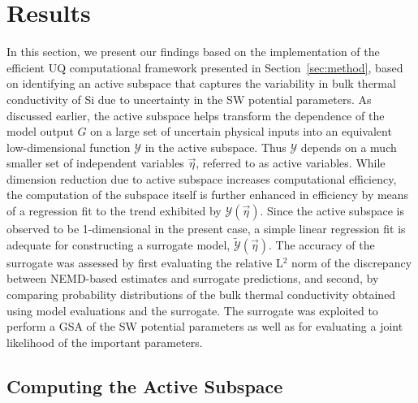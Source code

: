 \section{Results}
\label{sec:results}

In this section, we present our findings based on the implementation of the efficient UQ computational framework 
presented in Section~\ref{sec:method}, based on identifying an active subspace that captures the variability
in bulk thermal conductivity of Si due to uncertainty in the SW potential parameters. As discussed earlier, the
active subspace helps transform the dependence of the model output $G$ on a large set of uncertain physical
inputs into an equivalent low-dimensional function $\mathcal{Y}$ in the active subspace. 
Thus $\mathcal{Y}$ depends on a much smaller set of independent variables $\vec\eta$,
referred to as active variables. While dimension reduction due to active subspace
 increases computational efficiency, the computation of the subspace itself is further enhanced in efficiency
by means of a regression fit to the trend exhibited by $\mathcal{Y}(\vec{\eta})$. Since the active subspace is
observed to be 1-dimensional in the present case, a simple linear regression fit is adequate for constructing
a surrogate model, $\tilde{\mathcal{Y}}(\vec{\eta})$.
The accuracy of the surrogate was assessed by first evaluating the 
relative L$^2$ norm of the discrepancy between NEMD-based estimates and surrogate predictions,
and second, by comparing probability distributions of the bulk thermal conductivity obtained using
model evaluations and the surrogate. The surrogate was exploited to perform a GSA of the SW
potential parameters as well as for evaluating a joint likelihood of the important parameters.

\subsection{Computing the Active Subspace}
\label{sub:cas}

